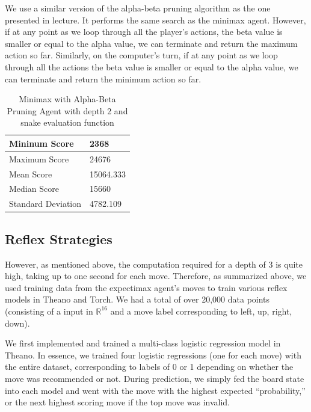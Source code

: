 \documentclass[9pt,twocolumn]{article}
\begin{document}
We use a similar version of the alpha-beta pruning algorithm as the one presented in lecture. It performs the same search as the minimax agent. However, if at any point as we loop through all the player's actions, the beta value is smaller or equal to the alpha value, we can terminate and return the maximum action so far. Similarly, on the computer's turn, if at any point as we loop through all the actions the beta value is smaller or equal to the alpha value, we can terminate and return the minimum action so far.

\begin{table}[!htbp]

\centering

\begin{tabular}{|l|l|}
\hline
Mininum Score      & 2368 \\ \hline
Maximum Score      & 24676 \\ \hline
Mean Score         & 15064.333 \\ \hline
Median Score       & 15660 \\ \hline
Standard Deviation & 4782.109 \\ \hline
\end{tabular}

\caption{Minimax with Alpha-Beta Pruning Agent with depth 2 and snake evaluation function}

\end{table}

\subsection{Reflex Strategies}

However, as mentioned above, the computation required for a depth of 3 is quite high, taking up to one second for each move. Therefore, as summarized above, we used training data from the expectimax agent’s moves to train various reflex models in Theano and Torch. We had a total of over 20,000 data points (consisting of a input in $\mathbb{R}^{16}$ and a move label corresponding to left, up, right, down).

We first implemented and trained a multi-class logistic regression model in Theano. In essence, we trained four logistic regressions (one for each move) with the entire dataset, corresponding to labels of 0 or 1 depending on whether the move was recommended or not. During prediction, we simply fed the board state into each model and went with the move with the highest expected “probability,” or the next highest scoring move if the top move was invalid.
\end{document}

